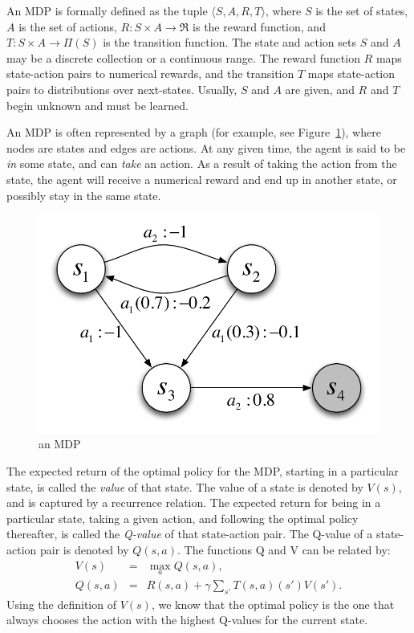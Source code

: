 An MDP is formally defined as the tuple $\langle S, A, R, T \rangle$, where $S$ is the set of states, $A$ is the set of actions, $R:S \times A \rightarrow \Re$ is the reward function, and $T:S \times A \rightarrow \Pi(S)$ is the transition function. The state and action sets $S$ and $A$ may be a discrete collection or a continuous range. The reward function $R$ maps state-action pairs to numerical rewards, and the transition $T$ maps state-action pairs to distributions over next-states. Usually, $S$ and $A$ are given, and $R$ and $T$ begin unknown and must be learned.

An MDP is often represented by a graph (for example, see Figure~\ref{intro:mdp}), where nodes are states and edges are actions. At any given time, the agent is said to be \emph{in} some state, and can \emph{take} an action. As a result of taking the action from the state, the agent will receive a numerical reward and end up in another state, or possibly stay in the same state.


\begin{figure}[t]
\begin{center}
\includegraphics[width=0.5\linewidth]{figures/mdp.pdf}
\caption{an MDP}
\label{intro:mdp}
\end{center}
\end{figure}



The expected return of the optimal policy for the MDP, starting in a particular state, is called the \emph{value} of that state. The value of a state is denoted by $V(s)$, and is captured by a recurrence relation. The expected return for being in a particular state, taking a given action, and following the optimal policy thereafter, is called the \emph{Q-value} of that state-action pair. The Q-value of a state-action pair is denoted by $Q(s,a)$. The functions Q and V can be related by:
\begin{eqnarray}
\label{intro:eqn:value} V(s) &=& \max_a Q(s,a),\\
\label{intro:eqn:qvalue} Q(s,a) &=& R(s,a) + \gamma \sum_{s'} T(s,a)(s') V(s').
\end{eqnarray}
Using the definition of $V(s)$, we know that the optimal policy is the one that always chooses the action with the highest Q-values for the current state.

